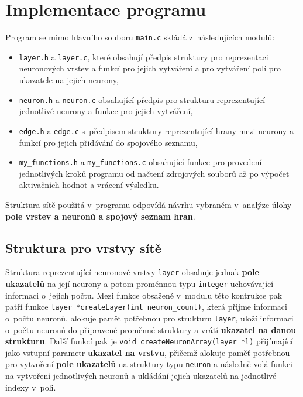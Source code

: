 \documentclass[11pt]{article}
\begin{document}
\newpage

\section{Implementace programu}
Program se mimo hlavního souboru \texttt{main.c} skládá z~následujících modulů:

\begin{itemize}
\item \texttt{layer.h} a \texttt{layer.c}, které obsahují předpis struktury pro reprezentaci neuronových vrstev a funkcí pro jejich vytváření a pro vytváření polí pro ukazatele na jejich neurony, 
\item \texttt{neuron.h} a \texttt{neuron.c} obsahující předpis pro strukturu reprezentující jednotlivé neurony a funkce pro jejich vytváření,
\item \texttt{edge.h} a \texttt{edge.c} s~předpisem struktury reprezentující hrany mezi neurony a funkcí pro jejich přidávání do spojového seznamu,
\item \texttt{my\_functions.h} a \texttt{my\_functions.c} obsahující funkce pro provedení jednotlivých kroků programu od načtení zdrojových souborů až po výpočet aktivačních hodnot a vrácení výsledku. 
\end{itemize}

Struktura sítě použitá v~programu odpovídá návrhu vybraném v~analýze úlohy – \textbf{pole vrstev a neuronů a spojový seznam hran}.

\subsection{Struktura pro vrstvy sítě}
Struktura reprezentující neuronové vrstvy \texttt{layer} obsahuje jednak \textbf{pole ukazatelů} na její neurony a potom proměnnou typu \texttt{integer} uchovávající informaci o~jejich počtu. Mezi funkce obsažené v~modulu této kontrukce pak patří funkce \texttt{layer *createLayer(int neuron\_count)}, která přijme informaci o~počtu neuronů, alokuje paměť potřebnou pro strukturu \texttt{layer}, uloží informaci o~počtu neuronů do připravené proměnné struktury a vrátí \textbf{ukazatel na danou strukturu}. Další funkcí pak je \texttt{void createNeuronArray(layer *l)} přijímající jako vstupní parametr \textbf{ukazatel na vrstvu}, přičemž alokuje paměť potřebnou pro vytvoření \textbf{pole ukazatelů} na struktury typu \texttt{neuron} a následně volá funkci na vytvoření jednotlivých neuronů a ukládání jejich ukazatelů na jednotlivé indexy v~poli.
\end{document}
